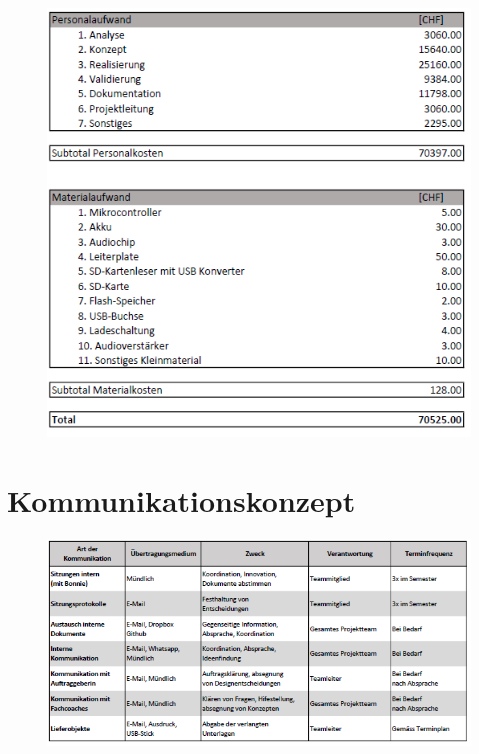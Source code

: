 \documentclass[10pt,a4paper,oneside]{99_fhnwreport}
\begin{document}
\begin{figure}[htbp]
	\centering
	\includegraphics[width=13.5cm]{Projektbudget.png}
\end{figure}


\newpage

\section{Kommunikationskonzept \label{sec:kommunikationskonzept}}

\begin{figure}[htbp]
	\centering
	\includegraphics[width=\textwidth]{Kommunikationskonzept.png}
	
\end{figure}
\end{document}
